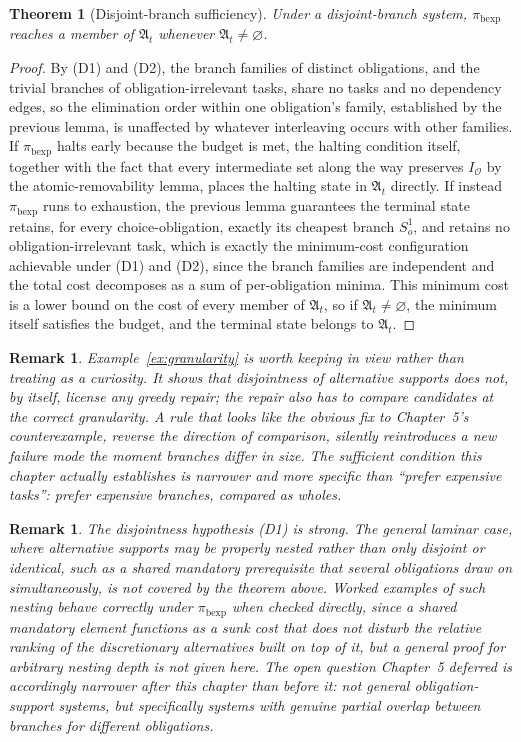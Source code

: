 \documentclass[11pt]{report}
\newtheorem{theorem}[definition]{Theorem}
\newtheorem{remark}[definition]{Remark}
\begin{document}
\begin{theorem}[Disjoint-branch sufficiency]
Under a disjoint-branch system, $\pi_{\mathrm{bexp}}$ reaches a member of $\mathfrak A_t$ whenever $\mathfrak A_t \ne \varnothing$.
\end{theorem}
\begin{proof}
By (D1) and (D2), the branch families of distinct obligations, and the trivial branches of obligation-irrelevant tasks, share no tasks and no dependency edges, so the elimination order within one obligation's family, established by the previous lemma, is unaffected by whatever interleaving occurs with other families. If $\pi_{\mathrm{bexp}}$ halts early because the budget is met, the halting condition itself, together with the fact that every intermediate set along the way preserves $I_{\mathcal O}$ by the atomic-removability lemma, places the halting state in $\mathfrak A_t$ directly. If instead $\pi_{\mathrm{bexp}}$ runs to exhaustion, the previous lemma guarantees the terminal state retains, for every choice-obligation, exactly its cheapest branch $S^1_o$, and retains no obligation-irrelevant task, which is exactly the minimum-cost configuration achievable under (D1) and (D2), since the branch families are independent and the total cost decomposes as a sum of per-obligation minima. This minimum cost is a lower bound on the cost of every member of $\mathfrak A_t$, so if $\mathfrak A_t \ne \varnothing$, the minimum itself satisfies the budget, and the terminal state belongs to $\mathfrak A_t$.
\end{proof}

\begin{remark}
Example~\ref{ex:granularity} is worth keeping in view rather than treating as a curiosity. It shows that disjointness of alternative supports does not, by itself, license any greedy repair; the repair also has to compare candidates at the correct granularity. A rule that looks like the obvious fix to Chapter~5's counterexample, reverse the direction of comparison, silently reintroduces a new failure mode the moment branches differ in size. The sufficient condition this chapter actually establishes is narrower and more specific than ``prefer expensive tasks'': prefer expensive \emph{branches}, compared as wholes.
\end{remark}

\begin{remark}
The disjointness hypothesis (D1) is strong. The general laminar case, where alternative supports may be properly nested rather than only disjoint or identical, such as a shared mandatory prerequisite that several obligations draw on simultaneously, is not covered by the theorem above. Worked examples of such nesting behave correctly under $\pi_{\mathrm{bexp}}$ when checked directly, since a shared mandatory element functions as a sunk cost that does not disturb the relative ranking of the discretionary alternatives built on top of it, but a general proof for arbitrary nesting depth is not given here. The open question Chapter~5 deferred is accordingly narrower after this chapter than before it: not general obligation-support systems, but specifically systems with genuine partial overlap between branches for different obligations.
\end{remark}
\end{document}
